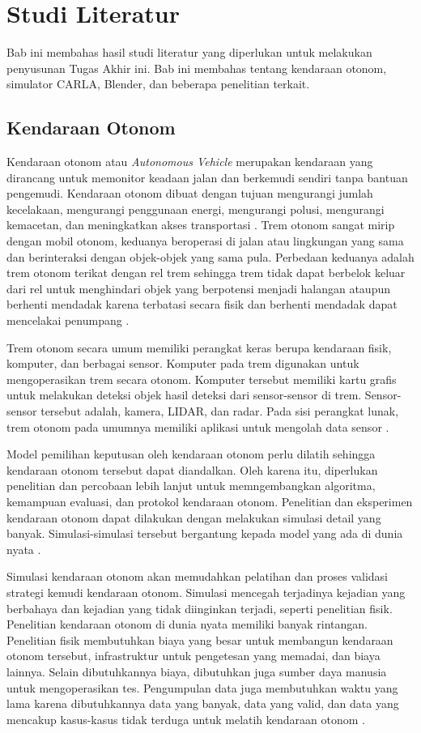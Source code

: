 \chapter{Studi Literatur}

Bab ini membahas hasil studi literatur yang diperlukan untuk melakukan
penyusunan Tugas Akhir ini. Bab ini membahas tentang kendaraan otonom, simulator
CARLA, Blender, dan beberapa penelitian terkait.

\section{Kendaraan Otonom}

Kendaraan otonom atau \textit{Autonomous Vehicle} merupakan kendaraan yang
dirancang untuk memonitor keadaan jalan dan berkemudi sendiri tanpa bantuan
pengemudi. Kendaraan otonom dibuat dengan tujuan mengurangi jumlah kecelakaan,
mengurangi penggunaan energi, mengurangi polusi, mengurangi kemacetan, dan
meningkatkan akses transportasi \parencite{av-bagloee}. Trem otonom sangat mirip
dengan mobil otonom, keduanya beroperasi di jalan atau lingkungan yang sama dan
berinteraksi dengan objek-objek yang sama pula. Perbedaan keduanya adalah trem
otonom terikat dengan rel trem sehingga trem tidak dapat berbelok keluar dari
rel untuk menghindari objek yang berpotensi menjadi halangan ataupun berhenti
mendadak karena terbatasi secara fisik dan berhenti mendadak dapat mencelakai
penumpang \parencite{at-palmer}.

Trem otonom secara umum memiliki perangkat keras berupa kendaraan fisik,
komputer, dan berbagai sensor. Komputer pada trem digunakan untuk mengoperasikan
trem secara otonom. Komputer tersebut memiliki kartu grafis untuk melakukan
deteksi objek hasil deteksi dari sensor-sensor di trem. Sensor-sensor tersebut
adalah, kamera, LIDAR, dan radar. Pada sisi perangkat lunak, trem otonom pada
umumnya memiliki aplikasi untuk mengolah data sensor \parencite{at-palmer}.

Model pemilihan keputusan oleh kendaraan otonom perlu dilatih sehingga kendaraan
otonom tersebut dapat diandalkan. Oleh karena itu, diperlukan penelitian dan
percobaan lebih lanjut untuk memngembangkan algoritma, kemampuan evaluasi, dan
protokol kendaraan otonom. Penelitian dan eksperimen kendaraan otonom dapat
dilakukan dengan melakukan simulasi detail yang banyak. Simulasi-simulasi
tersebut bergantung kepada model yang ada di dunia nyata \parencite{av-berger}.

Simulasi kendaraan otonom akan memudahkan pelatihan dan proses validasi strategi
kemudi kendaraan otonom. Simulasi mencegah terjadinya kejadian yang berbahaya
dan kejadian yang tidak diinginkan terjadi, seperti penelitian fisik. Penelitian
kendaraan otonom di dunia nyata memiliki banyak rintangan. Penelitian fisik
membutuhkan biaya yang besar untuk membangun kendaraan otonom tersebut,
infrastruktur untuk pengetesan yang memadai, dan biaya lainnya. Selain
dibutuhkannya biaya, dibutuhkan juga sumber daya manusia untuk mengoperasikan
tes. Pengumpulan data juga membutuhkan waktu yang lama karena dibutuhkannya data
yang banyak, data yang valid, dan data yang mencakup kasus-kasus tidak terduga
untuk melatih kendaraan otonom \parencite{carla-dosovitskiy}.

